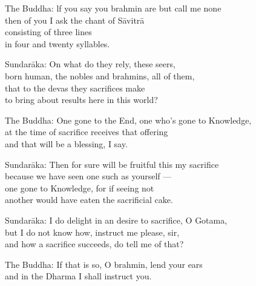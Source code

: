 \begin{MyDescription}{The Buddha:}
lf you say you brahmin are but call me none\\
then of you I ask the chant of S\=avitr\=a\\
consisting of three lines\\
in four and twenty syllables.
\end{MyDescription}

\begin{MyDescription}{Sundar\=aka:}
On what do they rely, these seers,\\
born human, the nobles and brahmins, all of them,\\
that to the devas they sacrifices make\\
to bring about results here in this world?
\end{MyDescription}   

\begin{MyDescription}{The Buddha:}
One gone to the End, one who's gone to Knowledge,\\
at the time of sacrifice receives that offering\\
and that will be a blessing, I say.
\end{MyDescription}

\begin{MyDescription}{Sundar\=aka:}
Then for sure will be fruitful this my sacrifice\\
because we have seen one such as yourself —\\
one gone to Knowledge, for if seeing not\\
another would have eaten the sacrificial cake.
\end{MyDescription}  
  


\begin{MyDescription}[]{Sundar\=aka:}
I do delight in an desire to sacrifice, O Gotama,\\
but I do not know how, instruct me please, sir,\\
and how a sacrifice succeeds, do tell me of that?
\end{MyDescription} 

\begin{MyDescription}{The Buddha:}
If that is so, O brahmin, lend your ears\\
and in the Dharma I shall instruct you.
\end{MyDescription}


